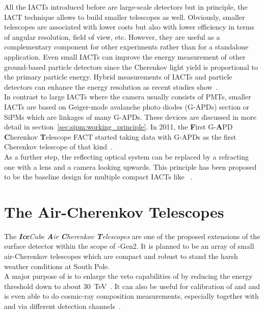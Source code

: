 All the IACTs introduced before are large-scale detectors but in principle, the IACT technique allows to build smaller telescopes as well. Obviously, smaller telescopes are associated with lower costs but also with lower efficiency in terms of angular resolution, field of view, etc. However, they are useful as a complementary component for other experiments rather than for a standalone application. Even small IACTs can improve the energy measurement of other ground-based particle detectors since the Cherenkov light yield is proportional to the primary particle energy. Hybrid measurements of IACTs and particle detectors can enhance the energy resolution as recent studies show~\cite{iacts:extension}.\\

In contrast to large IACTs where the camera usually consists of PMTs, smaller IACTs are based on Geiger-mode avalanche photo diodes (G-APDs) section or SiPMs which are linkages of many G-APDs. These devices are discussed in more detail in section~\ref{sec:sipm:working_principle}. In 2011, the \textbf{F}irst G-\textbf{A}PD \textbf{C}herenkov \textbf{T}elescope FACT started taking data with G-APDs as the first Cherenkov telescope of that kind~\cite{iacts:fact}.\\

As a further step, the reflecting optical system can be replaced by a refracting one with a lens and a camera looking upwards. This principle has been proposed to be the baseline design for multiple compact IACTs like \iceact~\cite{icecube:iceact}.

\section{The \icecube Air-Cherenkov Telescopes \iceact}\label{sec:iceact_intro}

The \textit{\textbf{Ice}Cube \textbf{A}ir \textbf{C}herenkov \textbf{T}elescopes} \textit{\iceact} are one of the proposed extensions of the surface detector \icetop within the scope of \icecube-Gen2. It is planned to be an array of small air-Cherenkov telescopes which are compact and robust to stand the harsh weather conditions at South Pole.\\

A major purpose of \iceact is to enlarge the veto capabilities of \icetop by reducing the energy threshold down to about \SI{30}{\tera\electronvolt}~\cite{icecube:iceact}. It can also be useful for calibration of \icecube and \icetop and is even able to do cosmic-ray composition measurements, especially together with \icecube and \icetop via different detection channels~\cite{iceact:composition}.\\

